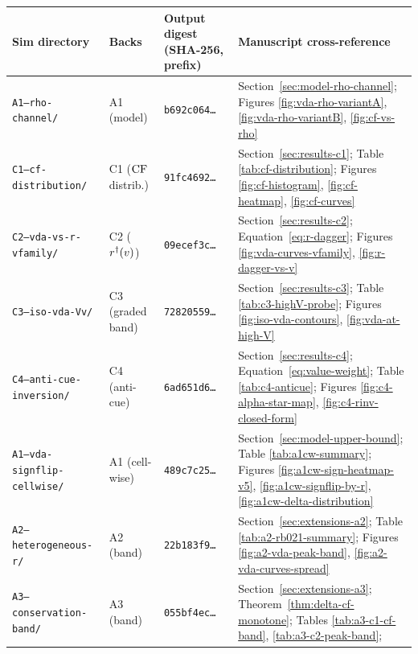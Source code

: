 \begin{table}[tb]
  \centering
  \small
  \begin{tabular}{@{}llp{2.6cm}p{6cm}@{}}
    \toprule
    Sim directory & Backs & Output digest (SHA-256, prefix) & Manuscript cross-reference \\
    \midrule
    \texttt{A1--rho-channel/}
      & A1 (model)
      & \texttt{b692c064\ldots}
      & Section~\ref{sec:model-rho-channel};
        Figures \ref{fig:vda-rho-variantA}, \ref{fig:vda-rho-variantB},
        \ref{fig:cf-vs-rho} \\
    \texttt{C1--cf-distribution/}
      & C1 ($\mathrm{CF}$ distrib.)
      & \texttt{91fc4692\ldots}
      & Section~\ref{sec:results-c1};
        Table \ref{tab:cf-distribution};
        Figures \ref{fig:cf-histogram}, \ref{fig:cf-heatmap},
        \ref{fig:cf-curves} \\
    \texttt{C2--vda-vs-r-vfamily/}
      & C2 ($r^{\dagger}(v)$)
      & \texttt{09ecef3c\ldots}
      & Section~\ref{sec:results-c2};
        Equation~\eqref{eq:r-dagger};
        Figures \ref{fig:vda-curves-vfamily}, \ref{fig:r-dagger-vs-v} \\
    \texttt{C3--iso-vda-Vv/}
      & C3 (graded band)
      & \texttt{72820559\ldots}
      & Section~\ref{sec:results-c3};
        Table \ref{tab:c3-highV-probe};
        Figures \ref{fig:iso-vda-contours}, \ref{fig:vda-at-high-V} \\
    \texttt{C4--anti-cue-inversion/}
      & C4 (anti-cue)
      & \texttt{6ad651d6\ldots}
      & Section~\ref{sec:results-c4};
        Equation~\eqref{eq:value-weight};
        Table \ref{tab:c4-anticue};
        Figures \ref{fig:c4-alpha-star-map}, \ref{fig:c4-rinv-closed-form} \\
    \texttt{A1--vda-signflip-cellwise/}
      & A1 (cell-wise)
      & \texttt{489c7c25\ldots}
      & Section~\ref{sec:model-upper-bound};
        Table \ref{tab:a1cw-summary};
        Figures \ref{fig:a1cw-sign-heatmap-v5},
        \ref{fig:a1cw-signflip-by-r},
        \ref{fig:a1cw-delta-distribution} \\
    \texttt{A2--heterogeneous-r/}
      & A2 (band)
      & \texttt{22b183f9\ldots}
      & Section~\ref{sec:extensions-a2};
        Table \ref{tab:a2-rb021-summary};
        Figures \ref{fig:a2-vda-peak-band}, \ref{fig:a2-vda-curves-spread} \\
    \texttt{A3--conservation-band/}
      & A3 (band)
      & \texttt{055bf4ec\ldots}
      & Section~\ref{sec:extensions-a3};
        Theorem~\ref{thm:delta-cf-monotone};
        Tables \ref{tab:a3-c1-cf-band}, \ref{tab:a3-c2-peak-band};

\end{tabular}
\end{table}
